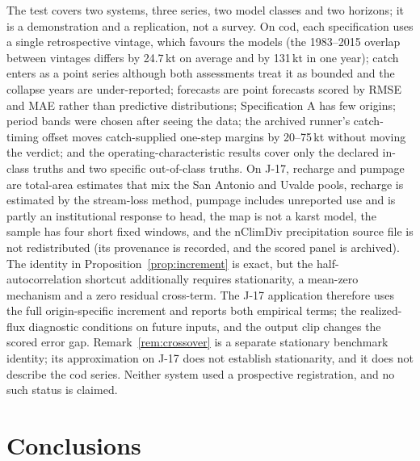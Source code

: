 The test covers two systems, three series, two model classes and two horizons; it is a demonstration and a replication, not a survey. On cod, each specification uses a single retrospective vintage, which favours the models (the 1983--2015 overlap between vintages differs by 24.7\,kt on average and by 131\,kt in one year); catch enters as a point series although both assessments treat it as bounded and the collapse years are under-reported; forecasts are point forecasts scored by RMSE and MAE rather than predictive distributions; Specification A has few origins; period bands were chosen after seeing the data; the archived runner's catch-timing offset moves catch-supplied one-step margins by 20--75\,kt without moving the verdict; and the operating-characteristic results cover only the declared in-class truths and two specific out-of-class truths. On J-17, recharge and pumpage are total-area estimates that mix the San Antonio and Uvalde pools, recharge is estimated by the stream-loss method, pumpage includes unreported use and is partly an institutional response to head, the map is not a karst model, the sample has four short fixed windows, and the nClimDiv precipitation source file is not redistributed (its provenance is recorded, and the scored panel is archived). The identity in Proposition~\ref{prop:increment} is exact, but the half-autocorrelation shortcut additionally requires stationarity, a mean-zero mechanism and a zero residual cross-term. The J-17 application therefore uses the full origin-specific increment and reports both empirical terms; the realized-flux diagnostic conditions on future inputs, and the output clip changes the scored error gap. Remark~\ref{rem:crossover} is a separate stationary benchmark identity; its approximation on J-17 does not establish stationarity, and it does not describe the cod series. Neither system used a prospective registration, and no such status is claimed.

\section{Conclusions}\label{sec:conclusions}

